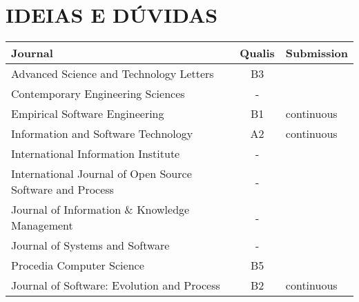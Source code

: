 \section{IDEIAS E DÚVIDAS}

\begin{table}[!htp]
  \begin{tabular}{lcl}
    \hline 
    \textbf{Journal} & \textbf{Qualis} & \textbf{Submission}\\
    \hline
    Advanced Science and Technology Letters & B3 & \\
    \hline
    Contemporary Engineering Sciences & - &\\
    \hline
    Empirical Software Engineering & B1 & continuous\\
    \hline
    Information and Software Technology & A2 & continuous\\
    \hline
    International Information Institute & - & \\
    \hline
    International Journal of Open Source Software and Process & - & \\
    \hline
    Journal of Information \& Knowledge Management & - &\\
    \hline
    Journal of Systems and Software & - &\\
    \hline
    Procedia Computer Science & B5 &\\
    \hline 
    Journal of Software: Evolution and Process & B2 & continuous\\
    \hline
  \end{tabular}
\end{table}

